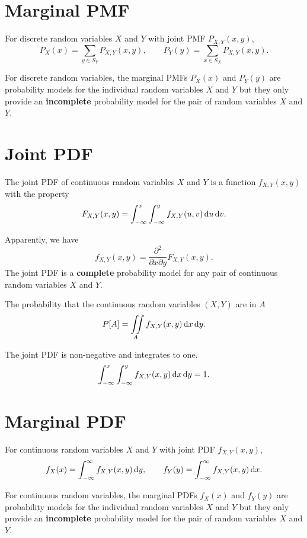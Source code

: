 \section{Marginal PMF}
\begin{theorem}
    For discrete random variables $X$ and $Y$ with joint PMF $P_{X,Y}(x,y)$, 
    \[P_X(x)=\sum_{y\in S_Y}P_{X,Y}(x,y), \qquad P_Y(y)=\sum_{x\in S_X}P_{X,Y}(x,y).\]
\end{theorem}
For discrete random variables, the marginal PMFs $P_X(x)$ and $P_Y(y)$ are probability models for the individual random variables $X$ and $Y$ but they only provide an \textbf{incomplete} probability model for the pair of random variables $X$ and $Y$.

\section{Joint PDF}
\begin{definition}
    The joint PDF of continuous random variables $X$ and $Y$ is a function $f_{X,Y}(x,y)$ with the property
    \[F_{X,Y}(x,y)=\int_{-\infty}^{x}\int_{-\infty}^{y}f_{X,Y}(u,v)\mathop{}\!\mathrm{d} u \mathop{}\!\mathrm{d} v.\]
\end{definition}

Apparently, we have
\[f_{X,Y}(x,y)=\frac{\partial^2}{\partial x\partial y}F_{X,Y}(x,y).\]
The joint PDF is a \textbf{complete} probability model for any pair of continuous random variables $X$ and $Y$.

\begin{theorem}
    The probability that the continuous random variables $(X,Y)$ are in $A$ 
    \[P[A]=\iint\limits_A f_{X,Y}(x,y)\mathop{}\!\mathrm{d} x\mathop{}\!\mathrm{d} y.\]
\end{theorem}

The joint PDF is non-negative and integrates to one.
\[\int_{-\infty}^{x}\int_{-\infty}^{y}f_{X,Y}(x,y)\mathop{}\!\mathrm{d} x\mathop{}\!\mathrm{d} y=1.\]

\section{Marginal PDF}
\begin{theorem}
    For continuous random variables $X$ and $Y$ with joint PDF $f_{X,Y}(x,y)$, 
    \[f_X(x)=\int_{-\infty}^{\infty}f_{X,Y}(x,y)\mathop{}\!\mathrm{d} y, \qquad f_Y(y)=\int_{-\infty}^{\infty}f_{X,Y}(x,y)\mathop{}\!\mathrm{d} x.\]
\end{theorem}
For continuous random variables, the marginal PDFs $f_X(x)$ and $f_Y(y)$ are probability models for the individual random variables $X$ and $Y$ but they only provide an \textbf{incomplete} probability model for the pair of random variables $X$ and $Y$.

